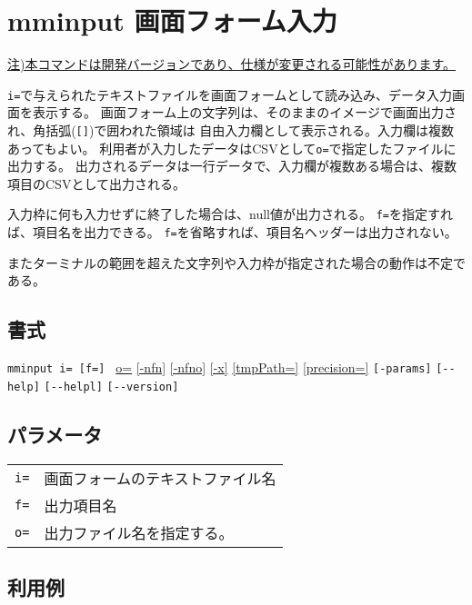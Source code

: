 
%

\section{mminput 画面フォーム入力\label{sect:mminput}}
\underline{注)本コマンドは開発バージョンであり、仕様が変更される可能性があります。}

\verb|i=|で与えられたテキストファイルを画面フォームとして読み込み、データ入力画面を表示する。
画面フォーム上の文字列は、そのままのイメージで画面出力され、角括弧(\verb|[]|)で囲われた領域は
自由入力欄として表示される。入力欄は複数あってもよい。
利用者が入力したデータはCSVとして\verb|o=|で指定したファイルに出力する。
出力されるデータは一行データで、入力欄が複数ある場合は、複数項目のCSVとして出力される。

入力枠に何も入力せずに終了した場合は、null値が出力される。
\verb|f=|を指定すれば、項目名を出力できる。
\verb|f=|を省略すれば、項目名ヘッダーは出力されない。

またターミナルの範囲を超えた文字列や入力枠が指定された場合の動作は不定である。

\subsection*{書式}
\verb/mminput i= [f=] /
\hyperref[sect:option_o]{o=}
\hyperref[sect:option_nfn]{[-nfn]} 
\hyperref[sect:option_nfno]{[-nfno]}  
\hyperref[sect:option_x]{[-x]}
\hyperref[sect:option_option_tmppath]{[tmpPath=]}
\hyperref[sect:option_precision]{[precision=]}
\verb|[-params]|
\verb|[--help]|
\verb|[--helpl]|
\verb|[--version]|\\

\subsection*{パラメータ}
\begin{table}[htbp]
{\small
\begin{tabular}{ll}
\verb|i=| & 画面フォームのテキストファイル名\\
\verb|f=| & 出力項目名\\
\verb|o=|    & 出力ファイル名を指定する。\\
\end{tabular} 
}
\end{table} 

\subsection*{利用例}

